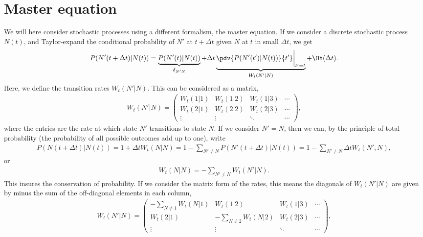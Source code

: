 \section{Master equation}

We will here consider stochastic processes using a different formalism, the master equation.
If we consider a discrete stochastic process $N(t)$, and Taylor-expand the conditional probability of $N'$ at $t + \Delta t$ given $N$ at $t$ in small $\Delta t$, we get
%
\begin{align}\label{eq: expansion cond prob}
    P(N'(t + \Delta t)| N(t)) = 
    \underbrace{P(N'(t)|N(t))}_{\delta_{N'N}} + \Delta t 
    \underbrace{\pdv{P(N'(t')|N(t))}{t'}\bigg|_{t'=t}}_{W_t(N'|N)} + \Oh(\Delta t).
\end{align}
%
Here, we define the transition rates $W_t(N'|N)$.
This can be considered as a matrix, 
%
\begin{align}
    W_t(N'|N) = 
    \begin{pmatrix}
        W_t(1|1) & W_t(1|2)& W_t(1|3) &\cdots\\
        W_t(2|1) & W_t(2|2)& W_t(2|3) &\cdots \\
        \vdots & \vdots & \ddots & \cdots
    \end{pmatrix},
\end{align}
%
where the entries are the rate at which state $N'$ transitions to state $N$.
If we consider $N' = N$, then we can, by the principle of total probability (the probability of all possible outcomes add up to one), write
%
\begin{align}
    P(N(t + \Delta t)| N(t)) = 1 + \Delta t W_t(N|N) 
    = 1 - \sum_{N' \neq N}P(N'(t + \Delta t)| N(t))
    = 1 - \sum_{N' \neq N}\Delta t W_t(N',N),
\end{align}
%
or
%
\begin{align}\label{eq: rate cons condition}
    W_t(N|N) = - \sum_{N'\neq N}W_t(N'|N).
\end{align}
%
This insures the conservation of probability.
If we consider the matrix form of the rates, this means the diagonals of $W_t(N'|N)$ are given by minus the sum of the off-diagonal elements in each column,
%
\begin{align}
    W_t(N'|N) = 
    \begin{pmatrix}
        - \sum_{N\neq 1} W_t(N|1) & W_t(1|2)& W_t(1|3) &\cdots\\
        W_t(2|1) & - \sum_{N\neq 2} W_t(N|2)& W_t(2|3) &\cdots \\
        \vdots & \vdots & \ddots & \cdots
    \end{pmatrix},
\end{align}
